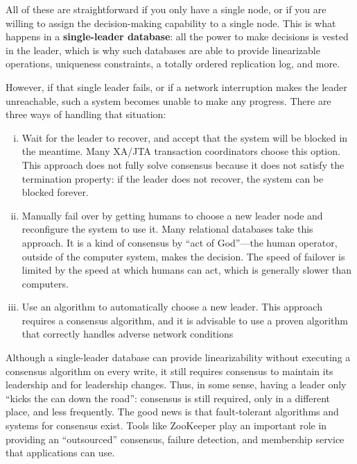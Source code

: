 \documentclass{article}
\begin{document}
    All of these are straightforward if you only have a single node, or if you are willing to assign the decision-making capability to a single node. This is what happens in a \textbf{single-leader database}: all the power to make decisions is vested in the leader, which is why such databases are able to provide linearizable operations, uniqueness constraints, a totally ordered replication log, and more.
    
    However, if that single leader fails, or if a network interruption makes the leader unreachable, such a system becomes unable to make any progress. There are three ways of handling that situation:
    
    \begin{enumerate}[i.]
        \item Wait for the leader to recover, and accept that the system will be blocked in the meantime. Many XA/JTA transaction coordinators choose this option. This approach does not fully solve consensus because it does not satisfy the termination property: if the leader does not recover, the system can be blocked forever.
        
        \item Manually fail over by getting humans to choose a new leader node and reconfigure the system to use it. Many relational databases take this approach. It is a kind of consensus by “act of God”—the human operator, outside of the computer system, makes the decision. The speed of failover is limited by the speed at which    humans can act, which is generally slower than computers.
        
        \item Use an algorithm to automatically choose a new leader. This approach requires a consensus algorithm, and it is advisable to use a proven algorithm that correctly handles adverse network conditions
    \end{enumerate}
    
    Although a single-leader database can provide linearizability without executing a consensus algorithm on every write, it still requires consensus to maintain its leadership and for leadership changes. Thus, in some sense, having a leader only ``kicks the can down the road”: consensus is still required, only in a different place, and less frequently. The good news is that fault-tolerant algorithms and systems for consensus exist. Tools like ZooKeeper play an important role in providing an ``outsourced” consensus, failure detection, and membership service that applications can use.
    
\end{document}
